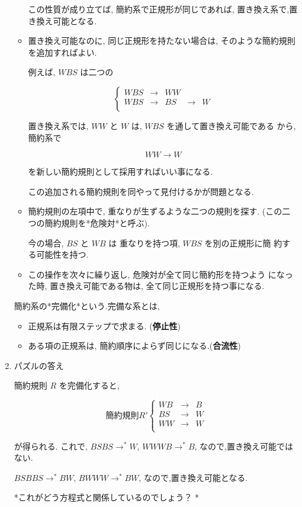 \documentclass[a4j,12pt]{jarticle}
\begin{document}
\begin{enumerate}
\begin{itemize}
この性質が成り立てば, 簡約系で正規形が同じであれば,
置き換え系で,置き換え可能となる.

\item 置き換え可能なのに, 同じ正規形を持たない場合は,
そのような簡約規則を追加すればよい.

例えば, \(WBS\) は二つの

$$\left\{ \begin{array}{rllll}
   WBS & \rightarrow  &  WW\\
   WBS & \rightarrow   & BS & \rightarrow  & W\\
         \end{array}
   \right.$$

置き換え系では, \(WW\) と \(W\) は, \(WBS\) を通して置き換え可能である
から, 簡約系で

$$WW  \rightarrow   W$$

を新しい簡約規則として採用すればいい事になる.

この追加される簡約規則を同やって見付けるかが問題となる.

\item 簡約規則の左項中で, 重なりが生ずるような二つの規則を探す.
(この二つの簡約規則を*危険対*と呼ぶ).

今の場合, \(BS\) と \(WB\) は 重なりを持つ項, \(WBS\) を別の正規形に簡
約する可能性を持つ.

\item この操作を次々に繰り返し, 危険対が全て同じ簡約形を持つよう
になった時, 置き換え可能である物は, 全て同じ正規形を持つ事になる.
\end{itemize}

簡約系の*完備化*という.完備な系とは,

\begin{itemize}
\item 正規系は有限ステップで求まる. (\textbf{停止性})

\item ある項の正規系は, 簡約順序によらず同じになる.(\textbf{合流性})
\end{itemize}

\item パズルの答え
\label{sec:org7de2611}

簡約規則 \(R\) を完備化すると,

$$簡約規則 R' \left\{ \begin{array}{rll}
WB & \rightarrow  &  B\\
BS & \rightarrow   & W  \\
WW & \rightarrow   & W  \\
      \end{array}
\right.$$

が得られる. これで, \(BSBS \rightarrow^* W\), \(WWWB \rightarrow^* B\),
なので,置き換え可能ではない.

\(BSBBS \rightarrow^* BW\), \(BWWW \rightarrow^* BW\),
なので,置き換え可能となる.

*これがどう方程式と関係しているのでしょう？ *
\end{enumerate}
\end{document}
